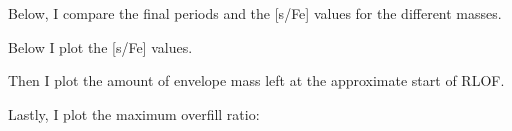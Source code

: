 \documentclass[a4paper,10pt]{article}
\begin{document}
Below, I compare the final periods and the [s/Fe] values for the different masses.
\begin{figure}[ht]
	\centering
\end{figure}

Below I plot the [s/Fe] values.

\begin{figure}[ht]
	\centering
\end{figure}

Then I plot the amount of envelope mass left at the approximate start of RLOF.

\begin{figure}[ht]
	\centering
\end{figure}

Lastly, I plot the maximum overfill ratio:

\begin{figure}[ht]
	\centering
\end{figure}

\begin{figure}[ht]
	\centering
\end{figure}

\begin{figure}[ht]
	\centering
\end{figure}

\begin{figure}[ht]
	\centering
\end{figure}


\end{document}
